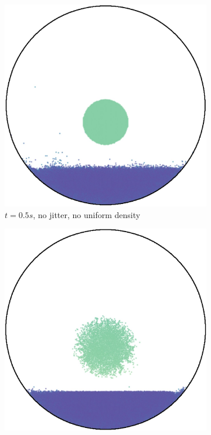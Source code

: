 \begin{figure}[hbt]
  \centering
  \begin{subfigure}[t]{0.3\textwidth}
    \centering
    \includegraphics*[width=\textwidth]{images/density/0.5shex0j.jpg}
    \caption{$t=0.5s$, no jitter, no uniform density}
    \label{fig:jitter-and-uniform-density-njndt0.5}
  \end{subfigure}
  \begin{subfigure}[t]{0.3\textwidth}
    \centering
    \includegraphics*[width=\textwidth]{images/density/0.5shex2.5j.jpg}

\end{subfigure}
\end{figure}
